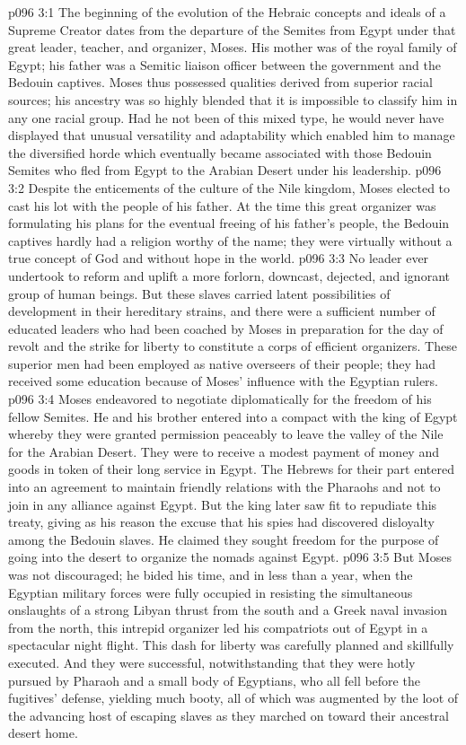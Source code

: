 \vs p096 3:1 The beginning of the evolution of the Hebraic concepts and ideals of a Supreme Creator dates from the departure of the Semites from Egypt under that great leader, teacher, and organizer, Moses. His mother was of the royal family of Egypt; his father was a Semitic liaison officer between the government and the Bedouin captives. Moses thus possessed qualities derived from superior racial sources; his ancestry was so highly blended that it is impossible to classify him in any one racial group. Had he not been of this mixed type, he would never have displayed that unusual versatility and adaptability which enabled him to manage the diversified horde which eventually became associated with those Bedouin Semites who fled from Egypt to the Arabian Desert under his leadership.
\vs p096 3:2 Despite the enticements of the culture of the Nile kingdom, Moses elected to cast his lot with the people of his father. At the time this great organizer was formulating his plans for the eventual freeing of his father’s people, the Bedouin captives hardly had a religion worthy of the name; they were virtually without a true concept of God and without hope in the world.
\pc \vs p096 3:3 No leader ever undertook to reform and uplift a more forlorn, downcast, dejected, and ignorant group of human beings. But these slaves carried latent possibilities of development in their hereditary strains, and there were a sufficient number of educated leaders who had been coached by Moses in preparation for the day of revolt and the strike for liberty to constitute a corps of efficient organizers. These superior men had been employed as native overseers of their people; they had received some education because of Moses’ influence with the Egyptian rulers.
\vs p096 3:4 Moses endeavored to negotiate diplomatically for the freedom of his fellow Semites. He and his brother entered into a compact with the king of Egypt whereby they were granted permission peaceably to leave the valley of the Nile for the Arabian Desert. They were to receive a modest payment of money and goods in token of their long service in Egypt. The Hebrews for their part entered into an agreement to maintain friendly relations with the Pharaohs and not to join in any alliance against Egypt. But the king later saw fit to repudiate this treaty, giving as his reason the excuse that his spies had discovered disloyalty among the Bedouin slaves. He claimed they sought freedom for the purpose of going into the desert to organize the nomads against Egypt.
\vs p096 3:5 But Moses was not discouraged; he bided his time, and in less than a year, when the Egyptian military forces were fully occupied in resisting the simultaneous onslaughts of a strong Libyan thrust from the south and a Greek naval invasion from the north, this intrepid organizer led his compatriots out of Egypt in a spectacular night flight. This dash for liberty was carefully planned and skillfully executed. And they were successful, notwithstanding that they were hotly pursued by Pharaoh and a small body of Egyptians, who all fell before the fugitives’ defense, yielding much booty, all of which was augmented by the loot of the advancing host of escaping slaves as they marched on toward their ancestral desert home.
